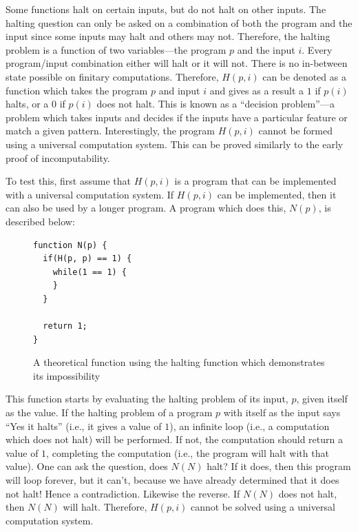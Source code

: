 Some functions halt on certain inputs, but do not halt on other inputs.  The halting question can only be asked on a combination of both the program and the input since some inputs may halt and others may not.  Therefore, the halting problem is a function of two variables---the program $p$ and the input $i$.  Every program/input combination either will halt or it will not.  There is no in-between state possible on finitary computations.  Therefore, $H(p, i)$ can be denoted as a function which takes the program $p$ and input $i$ and gives as a result a $1$ if $p(i)$ halts, or a $0$ if $p(i)$ does not halt.  This is known as a ``decision problem''---a problem which takes inputs and decides if the inputs have a particular feature or match a given pattern.  Interestingly, the program $H(p, i)$ cannot be formed using a universal computation system.  This can be proved similarly to the early proof of incomputability.  

To test this, first assume that $H(p, i)$ is a program that can be implemented with a universal computation system.  If $H(p, i)$ can be implemented, then it can also be used by a longer program.  A program which does this, $N(p)$, is described below:

\begin{figure}[H]
\begin{mdframed}
\begin{verbatim}
function N(p) {
  if(H(p, p) == 1) {
    while(1 == 1) {
    }
  }

  return 1;
}
\end{verbatim}
\end{mdframed}
\caption{A theoretical function using the halting function which demonstrates its impossibility}
\end{figure}

This function starts by evaluating the halting problem of its input, $p$, given itself as the value.  If the halting problem of a program $p$ with itself as the input says ``Yes it halts'' (i.e., it gives a value of $1$), an infinite loop (i.e., a computation which does not halt) will be performed.  If not, the computation should return a value of $1$, completing the computation (i.e., the program will halt with that value).  One can ask the question, does $N(N)$ halt?  If it does, then this program will loop forever, but it can't, because we have already determined that it does not halt!  Hence a contradiction.  Likewise the reverse.  If $N(N)$ does not halt, then $N(N)$ will halt. Therefore, $H(p, i)$ cannot be solved using a universal computation system.

